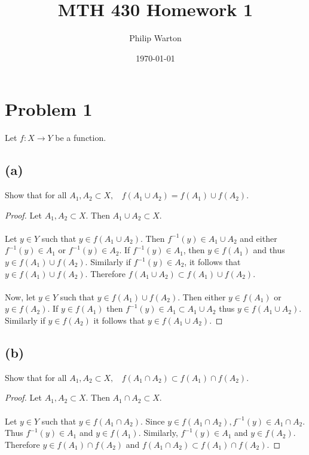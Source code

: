 \documentclass{article}
\begin{document}
\title{MTH 430 Homework 1}
\author{Philip Warton}
\date{\today}
\maketitle

\section*{Problem 1}
Let $f:X\rightarrow Y$ be a function.
\subsection*{(a)}
Show that for all $A_1, A_2 \subset X, \ \ \ \ f(A_1 \cup A_2) = f(A_1) \cup f(A_2)$.
\begin{proof}
    Let $A_1, A_2 \subset X$.
    Then $A_1 \cup A_2 \subset X$.
    \\\\
    Let $y \in Y$ such that $y \in f(A_1 \cup A_2)$.
    Then $f^{-1}(y) \in A_1 \cup A_2$ and either $f^{-1}(y) \in A_1$ or $f^{-1}(y) \in A_2$.
    If $f^{-1}(y) \in A_1$, then $y \in f(A_1)$ and thus $y \in f(A_1) \cup f(A_2)$.
    Similarly if $f^{-1}(y) \in A_2$, it follows that $y \in f(A_1) \cup f(A_2)$.
    Therefore $f(A_1 \cup A_2) \subset f(A_1) \cup f(A_2)$.
    \\\\
    Now, let $y \in Y$ such that $y \in f(A_1) \cup f(A_2)$.
    Then either $y \in f(A_1)$ or $y \in f(A_2)$.
    If $y \in f(A_1)$ then $f^{-1}(y) \in A_1 \subset A_1 \cup A_2$ thus $y \in f(A_1 \cup A_2)$.
    Similarly if $y \in f(A_2)$ it follows that $y \in f(A_1 \cup A_2)$.
\end{proof}
\subsection*{(b)}
Show that for all $A_1, A_2 \subset X, \ \ \ \ f(A_1 \cap A_2) \subset f(A_1) \cap f(A_2)$.
\begin{proof}
    Let $A_1, A_2 \subset X$.
    Then $A_1 \cap A_2 \subset X$.
    \\\\
    Let $y \in Y$ such that $y \in f(A_1 \cap A_2)$.
    Since $y \in f(A_1 \cap A_2), f^{-1}(y) \in A_1 \cap A_2$.
    Thus $f^{-1}(y) \in A_1$ and $y \in f(A_1)$.
    Similarly, $f^{-1}(y) \in A_1$ and $y \in f(A_2)$.
    Therefore $y \in f(A_1) \cap f(A_2)$ and $f(A_1 \cap A_2) \subset f(A_1) \cap f(A_2)$.
\end{proof}
\end{document}
